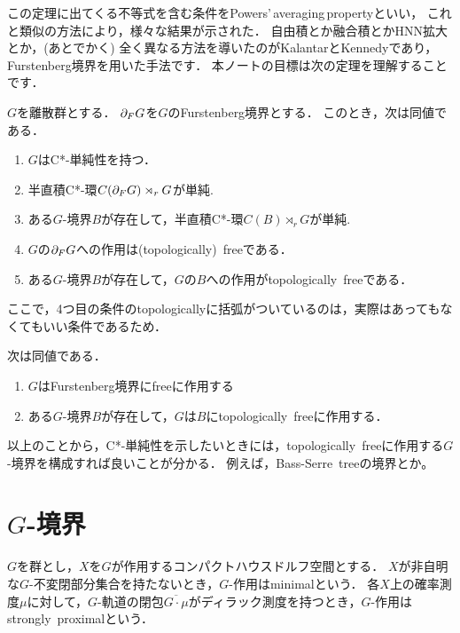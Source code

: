 \documentclass{jsarticle}[12pt]
\begin{document}
この定理に出てくる不等式を含む条件をPowers'\,averaging\,propertyといい，
これと類似の方法により，様々な結果が示された．
自由積とか融合積とかHNN拡大とか，(あとでかく)
全く異なる方法を導いたのがKalantarとKennedyであり，
Furstenberg境界を用いた手法です．
本ノートの目標は次の定理を理解することです．
\begin{theorem}
  $G$を離散群とする．
  $\frak{\partial}_F G$を$G$のFurstenberg境界とする．
  このとき，次は同値である．
  \begin{enumerate}
  \item $G$はC*-単純性を持つ．
  \item 半直積C*-環$C(\frak{\partial}_F G) \rtimes_r G$が単純.
  \item ある$G$-境界$B$が存在して，半直積C*-環$C(B) \rtimes_r G$が単純.
  \item $G$の$\frak{\partial}_F G$への作用は(topologically)\, freeである．
  \item ある$G$-境界$B$が存在して，$G$の$B$への作用がtopologically\, freeである．
  \end{enumerate}
\end{theorem}
ここで，4つ目の条件のtopologicallyに括弧がついているのは，実際はあってもなくてもいい条件であるため．
\begin{theorem}
  次は同値である．
  \begin{enumerate}
  \item $G$はFurstenberg境界にfreeに作用する
  \item ある$G$-境界$B$が存在して，$G$は$B$にtopologically\, freeに作用する．
  \end{enumerate}
\end{theorem}
以上のことから，C*-単純性を示したいときには，topologically\, freeに作用する$G$-境界を構成すれば良いことが分かる．
例えば，Bass-Serre\, treeの境界とか。

\section{$G$-境界}
\begin{definition}
  $G$を群とし，$X$を$G$が作用するコンパクトハウスドルフ空間とする．
  $X$が非自明な$G$-不変閉部分集合を持たないとき，$G$-作用はminimalという．
  各$X$上の確率測度$\mu$に対して，$G$-軌道の閉包$\overline{G\cdot \mu}$がディラック測度を持つとき，$G$-作用はstrongly\, proximalという．
\end{definition}
\end{document}
